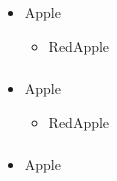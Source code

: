 \begin{frame}[plain]	
	\frametitle{}
	
	\begin{itemize}\Large
		\item Apple
		\begin{itemize}\large
			\item RedApple
			
		\end{itemize}
	\end{itemize}
	
	
\end{frame}
\begin{frame}[plain]	
	\frametitle{}

\begin{itemize}
	\item Apple
	\begin{itemize}
		\item RedApple
		
	\end{itemize}
\end{itemize}
	
	
\end{frame}

\begin{frame}[plain]	
	\frametitle{}

\begin{itemize}
	\item Apple
	

\end{itemize}	
	
\end{frame}

\begin{frame}[plain]	
	\frametitle{}
	
	
\end{frame}

